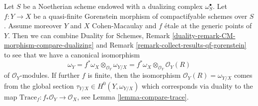 \begin{remark}
\label{remark-collect-results-qf-gorenstein-two}
Let $S$ be a Noetherian scheme endowed with a dualizing complex
$\omega_S^\bullet$. Let $f : Y \to X$ be a quasi-finite Gorenstein
morphism of compactifyable schemes over $S$. Assume moreover
$Y$ and $X$ Cohen-Macaulay and $f$ \'etale at the generic
points of $Y$. Then we can combine
Duality for Schemes, Remark
\ref{duality-remark-CM-morphism-compare-dualizing} and
Remark \ref{remark-collect-results-qf-gorenstein}
to see that we have a canonical isomorphism
$$
\omega_Y = f^*\omega_X \otimes_{\mathcal{O}_Y} \omega_{Y/X} =
f^*\omega_X \otimes_{\mathcal{O}_Y} \mathcal{O}_Y(R)
$$
of $\mathcal{O}_Y$-modules. If further $f$ is finite,
then the isomorphism $\mathcal{O}_Y(R) = \omega_{Y/X}$ comes
from the global section $\tau_{Y/X} \in H^0(Y, \omega_{Y/X})$
which corresponds via duality to the map
$\text{Trace}_f : f_*\mathcal{O}_Y \to \mathcal{O}_X$, see
Lemma \ref{lemma-compare-trace}.
\end{remark}












